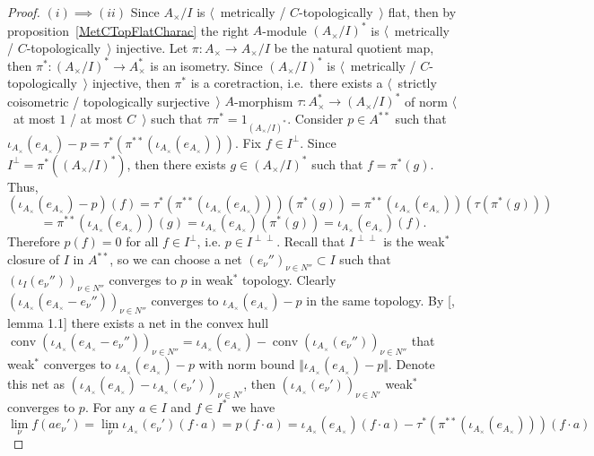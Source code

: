 \begin{proof} $(i)\implies (ii)$  Since $A_\times /I$ is $\langle$~metrically
/ $C$-topologically~$\rangle$ flat, then by proposition~\ref{MetCTopFlatCharac} 
the right $A$-module ${(A_\times /I)}^*$ is $\langle$~metrically /
$C$-topologically~$\rangle$ injective. Let $\pi:A_\times \to A_\times /I$ be the
natural quotient map, then $\pi^*:{(A_\times /I)}^*\to A_\times ^*$ is an
isometry. Since ${(A_\times /I)}^*$ is $\langle$~metrically /
$C$-topologically~$\rangle$ injective, then $\pi^*$ is a coretraction, i.e.\
there exists a $\langle$~strictly coisometric / topologically
surjective~$\rangle$ $A$-morphism $\tau:A_\times ^*\to {(A_\times /I)}^*$ of
norm $\langle$~at most $1$ / at most $C$~$\rangle$ such that
$\tau\pi^*=1_{{(A_\times /I)}^*}$. Consider $p\in A^{**}$ such that
$\iota_{A_\times }(e_{A_\times })-p
=\tau^*(\pi^{**}(\iota_{A_\times }(e_{A_\times })))$. 
Fix $f\in I^\perp$. Since $I^\perp=\pi^*({(A_\times /I)}^*)$, 
then there exists $g\in {(A_\times /I)}^*$ such that $f=\pi^*(g)$. Thus,
$$
(\iota_{A_\times }(e_{A_\times })-p)(f)
=\tau^*(\pi^{**}(\iota_{A_\times }(e_{A_\times })))(\pi^*(g))
=\pi^{**}(\iota_{A_\times }(e_{A_\times }))(\tau(\pi^*(g)))
$$
$$
=\pi^{**}(\iota_{A_\times }(e_{A_\times }))(g)
=\iota_{A_\times }(e_{A_\times })(\pi^*(g))
=\iota_{A_\times }(e_{A_\times })(f).
$$
Therefore $p(f)=0$ for all $f\in I^\perp$, i.e. $p\in I^{\perp\perp}$. Recall
that $I^{\perp\perp}$ is the weak${}^*$ closure of $I$ in $A^{**}$, so we can
choose a net ${(e_\nu'')}_{\nu\in N''}\subset I$ such that
${(\iota_I(e_\nu''))}_{\nu\in N''}$ converges to $p$ in weak${}^*$ topology.
Clearly ${(\iota_{A_\times }(e_{A_\times }-e_\nu''))}_{\nu\in N''}$ converges to
$\iota_{A_\times }(e_{A_\times })-p$ in the same topology. By
[\cite{PosAndApproxIdinBanAlg}, lemma 1.1] there exists a net in the convex hull
$\operatorname{conv}{
    (\iota_{A_\times }(e_{A_\times }-e_\nu''))
}_{\nu\in N''}
=\iota_{A_\times }(e_{A_\times })
-\operatorname{conv}{(\iota_{A_\times}(e_\nu''))}_{\nu\in N''}$ 
that weak${}^*$ converges to $\iota_{A_\times }(e_{A_\times })-p$ with 
norm bound $\Vert \iota_{A_\times }(e_{A_\times})-p\Vert$. 
Denote this net as 
${(\iota_{A_\times }(e_{A_\times })-\iota_{A_\times }(e_\nu'))}_{\nu\in N'}$, 
then ${(\iota_{A_\times }(e_\nu'))}_{\nu\in N'}$ weak${}^*$ converges to $p$. 
For any $a\in I$ and $f\in I^*$ we have
$$
\lim_{\nu}f(ae_\nu')
=\lim_{\nu}\iota_{A_\times }(e_\nu')(f\cdot a)
=p(f\cdot a)
=\iota_{A_\times }(e_{A_\times })(f\cdot a)
-\tau^*(\pi^{**}(\iota_{A_\times }(e_{A_\times })))(f\cdot a)
$$

\end{proof}
